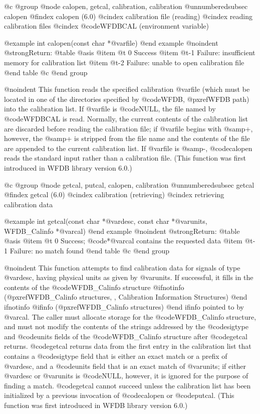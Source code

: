 {{{{{{{{@c @group
@node   calopen, getcal, calibration, calibration
@unnumberedsubsec calopen
@findex calopen (6.0)
@cindex calibration file (reading)
@cindex reading calibration files
@cindex @code{WFDBCAL} (environment variable)

@example
int calopen(const char *@var{file})
@end example
@noindent
@strong{Return:}
@table @asis
@item @t{ 0}
Success
@item @t{-1}
Failure: insufficient memory for calibration list
@item @t{-2}
Failure: unable to open calibration file
@end table
@c @end group

@noindent
This function reads the specified calibration @var{file} (which must be
located in one of the directories specified by @code{WFDB},
@pxref{WFDB path}) into the calibration list.  If @var{file} is
@code{NULL}, the file named by @code{WFDBCAL} is read.  Normally, the
current contents of the calibration list are discarded before reading
the calibration file; if @var{file} begins with @samp{+}, however, the
@samp{+} is stripped from the file name and the contents of the file are
appended to the current calibration list.  If @var{file} is @samp{-},
@code{calopen} reads the standard input rather than a calibration file.
(This function was first introduced in WFDB library version 6.0.)

@c @group
@node   getcal, putcal, calopen, calibration
@unnumberedsubsec getcal
@findex getcal (6.0)
@cindex calibration (retrieving)
@cindex retrieving calibration data

@example
int getcal(const char *@var{desc}, const char *@var{units}, WFDB_Calinfo *@var{cal})
@end example
@noindent
@strong{Return:}
@table @asis
@item @t{ 0}
Success;  @code{*@var{cal}} contains the requested data
@item @t{-1}
Failure: no match found
@end table
@c @end group

@noindent
This function attempts to find calibration data for signals of type
@var{desc}, having physical units as given by @var{units}.  If
successful, it fills in the contents of the @code{WFDB_Calinfo} structure
@ifnotinfo
(@pxref{WFDB_Calinfo structures, , Calibration Information Structures})
@end ifnotinfo
@ifinfo
(@pxref{WFDB_Calinfo structures})
@end ifinfo
pointed to by @var{cal}.  The caller must allocate storage for the
@code{WFDB_Calinfo} structure, and must not modify the contents of the
strings addressed by the @code{sigtype} and @code{units} fields of the
@code{WFDB_Calinfo} structure after @code{getcal} returns.  @code{getcal}
returns data from the first entry in the calibration list that contains
a @code{sigtype} field that is either an exact match or a prefix of
@var{desc}, and a @code{units} field that is an exact match of
@var{units}; if either @var{desc} or @var{units} is @code{NULL},
however, it is ignored for the purpose of finding a match.
@code{getcal} cannot succeed unless the calibration list has been
initialized by a previous invocation of @code{calopen} or @code{putcal}.
(This function was first introduced in WFDB library version 6.0.)

}}}}}}}}
